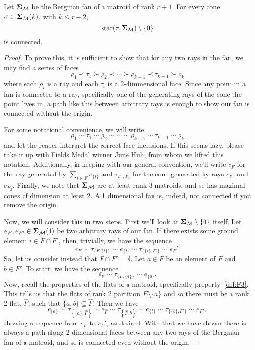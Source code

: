 \documentclass[12pt,oneside]{../../sfsuthesis}
\begin{document}
\begin{lemma}[Connectedness]\th\label{thm:matroidConnected}
    Let \( \bm{\Sigma}_{\mathcal{M}} \) be the Bergman fan of a matroid of rank \( r + 1 \).
    For every cone \( \sigma \in \bm{\Sigma}_{\mathcal{M}}(k) \), with \( k \leq r - 2 \),
    \[
        \operatorname{star}(\tau, \bm{\Sigma}_{\mathcal{M}}) \setminus \{ 0 \}
    \]
    is connected.
\end{lemma}
\begin{proof}
    To prove this, it is sufficient to show that for any two rays in the fan, we may find a series of faces
    \[
        \rho_1 \prec \tau_1 \succ \rho_2 \prec \cdots \succ \rho_{k-1} \prec \tau_{k-1} \succ \rho_k
    \]
    where each \( \rho_i \) is a ray and each \( \tau_i \) is a 2-dimmensional face.
    Since any point in a fan is connected to a ray, specifically one of the generating rays of the cone the point lives in, a path like this between arbitrary rays is enough to show our fan is connected without the origin.

    For some notational convenience, we will write
    \[
        \rho_1 \sim \tau_1 \sim \rho_2 \sim \cdots \sim \rho_{k-1} \sim \tau_{k-1} \sim \rho_k
    \]
    and let the reader interpret the correct face inclusions.
    If this seems lazy, please take it up with Fields Medal winner June Huh, from whom we lifted this notation.
    Additionally, in keeping with our general convention, we'll write \( e_F \) for the ray generated by \( \sum_{i \in F} e_{\{i\}} \) and \( \tau_{F_1, F_2} \) for the cone generated by rays \( e_{F_1} \) and \( e_{F_2} \).
    Finally, we note that \( \bm{\Sigma}_{\mathcal{M}} \) are at least rank 3 matroids, and so has maximal cones of dimension at least 2.
    A 1 dimensional fan is, indeed, not connected if you remove the origin.

    Now, we will consider this in two steps.
    First we'll look at \( \bm{\Sigma}_{\mathcal{M}} \setminus \{ 0 \} \) itself.
    Let \( e_{F}, e_{F'} \in \bm{\Sigma}_{\mathcal{M}}(1) \) be two arbitrary rays of our fan.
    If there exists some ground element \( i \in F \cap F' \), then, trivially, we have the sequence
    \[
        e_F \sim \tau_{\{F, \{i\}\}} \sim e_{\{i\}} \sim \tau_{\{\{i\}, F'\}} \sim e_F'.
    \]
    So, let us consider instead that \( F \cap F' = \emptyset \).
    Let \( a \in F \) be an element of \( F \) and \( b \in F' \).
    To start, we have the sequence
    \[
        e_F \sim \tau_{\{F, \{a\}\}} \sim e_{\{a\}}.
    \]
    Now, recall the properties of the flats of a matroid, specifically property~\ref{def:F3}.
    This tells us that the flats of rank 2 partition \( E \setminus \{a\} \) and so there must be a rank 2 flat, \( \widehat{F} \), such that \( \{ a, b \} \subseteq \widehat{F} \).
    Then we have
    \[
        e_{\{a\}} \sim \tau_{\left\{\{a\}, \widehat{F}\right\}} \sim e_{\widehat{F}} \sim \tau_{\left\{\widehat{F}, b\right\}} \sim e_{\{b\}} \sim \tau_{\{\{b\}, F'\}} \sim e_{F'},
    \]
    showing a sequence from \( e_F \) to \( e_F' \), as desired.
    With that we have shown there is always a path along 2 dimensional faces between any two rays of the Bergman fan of a matroid, and so is connected even without the origin.


\end{proof}
\end{document}
